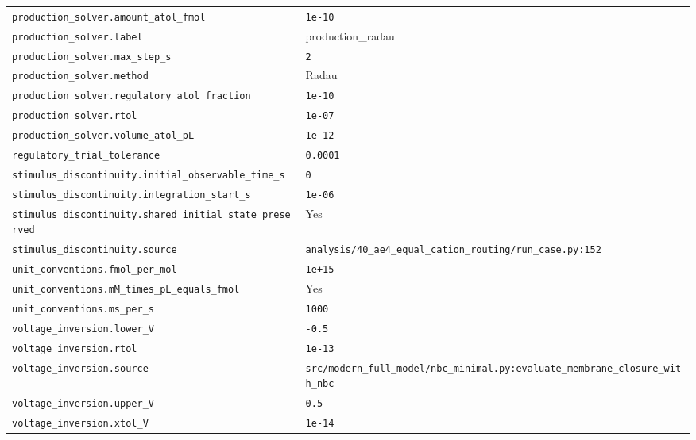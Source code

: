 \begin{longtable}{p{.49\linewidth}p{.43\linewidth}}
\nolinkurl{production_solver.amount_atol_fmol} & \texttt{1e-10} \\
\nolinkurl{production_solver.label} & production\_radau \\
\nolinkurl{production_solver.max_step_s} & \texttt{2} \\
\nolinkurl{production_solver.method} & Radau \\
\nolinkurl{production_solver.regulatory_atol_fraction} & \texttt{1e-10} \\
\nolinkurl{production_solver.rtol} & \texttt{1e-07} \\
\nolinkurl{production_solver.volume_atol_pL} & \texttt{1e-12} \\
\nolinkurl{regulatory_trial_tolerance} & \texttt{0.0001} \\
\nolinkurl{stimulus_discontinuity.initial_observable_time_s} & \texttt{0} \\
\nolinkurl{stimulus_discontinuity.integration_start_s} & \texttt{1e-06} \\
\nolinkurl{stimulus_discontinuity.shared_initial_state_preserved} & Yes \\
\nolinkurl{stimulus_discontinuity.source} & \nolinkurl{analysis/40_ae4_equal_cation_routing/run_case.py:152} \\
\nolinkurl{unit_conventions.fmol_per_mol} & \texttt{1e+15} \\
\nolinkurl{unit_conventions.mM_times_pL_equals_fmol} & Yes \\
\nolinkurl{unit_conventions.ms_per_s} & \texttt{1000} \\
\nolinkurl{voltage_inversion.lower_V} & \texttt{-0.5} \\
\nolinkurl{voltage_inversion.rtol} & \texttt{1e-13} \\
\nolinkurl{voltage_inversion.source} & \nolinkurl{src/modern_full_model/nbc_minimal.py:evaluate_membrane_closure_with_nbc} \\
\nolinkurl{voltage_inversion.upper_V} & \texttt{0.5} \\
\nolinkurl{voltage_inversion.xtol_V} & \texttt{1e-14} \\
\end{longtable}
\endgroup


